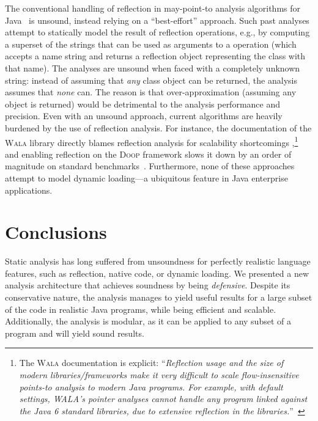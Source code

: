 The conventional handling of reflection in may-point-to analysis
algorithms for
Java~\cite{www:wala-reflection,ecoop:2014:Li,aplas:2005:Livshits,thesis:Livshits,aplas:2015:Smaragdakis,sas:2015:Li}
is unsound, instead relying on a ``best-effort'' approach.  Such past
analyses attempt to statically model the result of reflection
operations, e.g., by computing a superset of the strings that can be
used as arguments to a  operation (which accepts a
name string and returns a reflection object representing the class
with that name).
The analyses are unsound when faced with a completely unknown string:
instead of assuming that \emph{any} class object can be returned, the
analysis assumes that \emph{none} can. The reason is that
over-approximation (assuming any object is returned) would be
detrimental to the analysis performance and precision. Even with an
unsound approach, current algorithms are heavily burdened by the use
of reflection analysis. For instance, the documentation of the
\textsc{Wala} library directly blames reflection analysis for
scalability shortcomings
\cite{www:wala-reflection},\footnote{The \textsc{Wala} documentation
  is explicit: ``\emph{Reflection usage and the
    size of modern libraries/frameworks make it very difficult to
    scale flow-insensitive points-to analysis to modern Java
    programs. For example, with default settings, WALA's pointer
    analyses cannot handle any program linked against the Java 6
    standard libraries, due to extensive reflection in the
    libraries.}''~\cite{www:wala-reflection}} and enabling reflection
on the \textsc{Doop} framework slows it down by an order of magnitude
on standard benchmarks~\cite{aplas:2015:Smaragdakis}.
Furthermore, none
of these approaches attempt to model dynamic loading---a ubiquitous
feature in Java enterprise applications.





\section{Conclusions}

Static analysis has long suffered from unsoundness for perfectly
realistic language features, such as reflection, native code, or
dynamic loading. We presented a new analysis architecture that
achieves soundness by being \emph{defensive}. Despite its conservative
nature, the analysis manages to yield useful results for a large
subset of the code in realistic Java programs, while being efficient
and scalable. Additionally, the analysis is modular, as it can be
applied to any subset of a program and will yield sound results.

